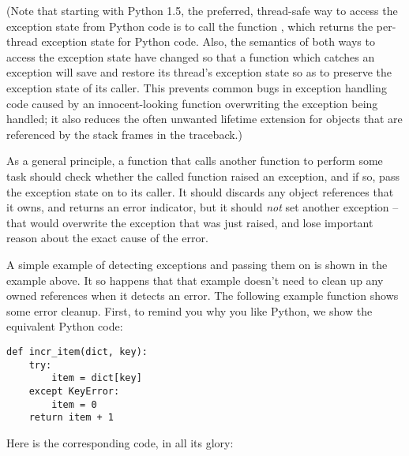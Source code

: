 \documentclass[twoside,openright]{report}
\begin{document}
(Note that starting with Python 1.5, the preferred, thread-safe way to 
access the exception state from Python code is to call the function 
, which returns the per-thread exception state 
for Python code.  Also, the semantics of both ways to access the 
exception state have changed so that a function which catches an 
exception will save and restore its thread's exception state so as to 
preserve the exception state of its caller.  This prevents common bugs 
in exception handling code caused by an innocent-looking function 
overwriting the exception being handled; it also reduces the often 
unwanted lifetime extension for objects that are referenced by the 
stack frames in the traceback.)

As a general principle, a function that calls another function to 
perform some task should check whether the called function raised an 
exception, and if so, pass the exception state on to its caller.  It 
should discards any object references that it owns, and returns an 
error indicator, but it should \emph{not} set another exception -- 
that would overwrite the exception that was just raised, and lose 
important reason about the exact cause of the error.

A simple example of detecting exceptions and passing them on is shown 
in the  example above.  It so happens that that 
example doesn't need to clean up any owned references when it detects 
an error.  The following example function shows some error cleanup.  
First, to remind you why you like Python, we show the equivalent
Python code:

\begin{verbatim}
def incr_item(dict, key):
    try:
        item = dict[key]
    except KeyError:
        item = 0
    return item + 1
\end{verbatim}

Here is the corresponding \C{} code, in all its glory:
\end{document}
